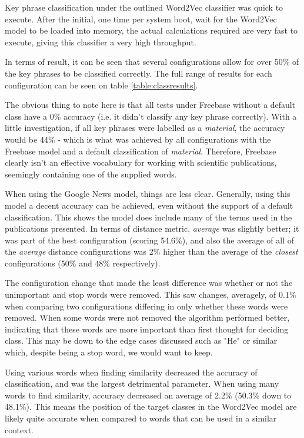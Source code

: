 Key phrase classification under the outlined Word2Vec classifier was quick to execute. After the initial, one time per system boot, wait for the Word2Vec model to be loaded into memory, the actual calculations required are very fast to execute, giving this classifier a very high throughput.

In terms of result, it can be seen that several configurations allow for over 50\% of the key phrases to be classified correctly. The full range of results for each configuration can be seen on table \ref{table:classresults}.

The obvious thing to note here is that all tests under Freebase without a default class have a 0\% accuracy (i.e. it didn't classify any key phrase correctly). With a little investigation, if all key phrases were labelled as a \textit{material}, the accuracy would be 44\% - which is what was achieved by all configurations with the Freebase model and a default classification of \textit{material}. Therefore, Freebase clearly isn't an effective vocabulary for working with scientific publications, seemingly containing one of the supplied words. 

When using the Google News model, things are less clear. Generally, using this model a decent accuracy can be achieved, even without the support of a default classification. This shows the model does include many of the terms used in the publications presented. In terms of distance metric, \textit{average} was slightly better; it was part of the best configuration (scoring 54.6\%), and also the average of all of the \textit{average} distance configurations was 2\% higher than the average of the \textit{closest} configurations (50\% and 48\% respectively).

The configuration change that made the least difference was whether or not the unimportant and stop words were removed. This saw changes, averagely, of 0.1\% when comparing two configurations differing in only whether these words were removed. When some words were not removed the algorithm performed better, indicating that these words are more important than first thought for deciding class. This may be down to the edge cases discussed such as "He" or similar which, despite being a stop word, we would want to keep.

Using various words when finding similarity decreased the accuracy of classification, and was the largest detrimental parameter. When using many words to find similarity, accuracy decreased an average of 2.2\% (50.3\% down to 48.1\%). This means the position of the target classes in the Word2Vec model are likely quite accurate when compared to words that can be used in a similar context.

